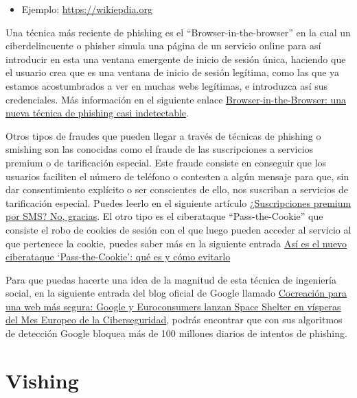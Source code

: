 \documentclass[
  a4paper,
  openany]{book}
\providecommand{\tightlist}{%
  \setlength{\itemsep}{0pt}\setlength{\parskip}{0pt}}
\begin{document}
\begin{itemize}
\tightlist
\item
  Ejemplo: \url{https://wikiepdia.org}
\end{itemize}

Una técnica más reciente de phishing es el ``Browser-in-the-browser'' en la cual un ciberdelincuente o phisher simula una página de un servicio online para así introducir en esta una ventana emergente de inicio de sesión única, haciendo que el usuario crea que es una ventana de inicio de sesión legítima, como las que ya estamos acostumbrados a ver en muchas webs legítimas, e introduzca así sus credenciales. Más información en el siguiente enlace \href{https://www.incibe.es/ciudadania/blog/browser-browser-una-nueva-tecnica-de-phishing-casi-indetectable}{Browser-in-the-Browser: una nueva técnica de phishing casi indetectable}.

Otros tipos de fraudes que pueden llegar a través de técnicas de phishing o smishing son las conocidas como el fraude de las suscripciones a servicios premium o de tarificación especial. Este fraude consiste en conseguir que los usuarios faciliten el número de teléfono o contesten a algún mensaje para que, sin dar consentimiento explícito o ser conscientes de ello, nos suscriban a servicios de tarificación especial. Puedes leerlo en el siguiente artículo \href{https://www.incibe.es/ciudadania/blog/suscripciones-premium-por-sms-no-gracias}{¿Suscripciones premium por SMS? No, gracias}. El otro tipo es el ciberataque ``Pass-the-Cookie'' que consiste el robo de cookies de sesión con el que luego pueden acceder al servicio al que pertenece la cookie, puedes saber más en la siguiente entrada \href{https://www.20minutos.es/tecnologia/ciberseguridad/ciberataque-pass-the-cookie-que-es-como-evitarlo-5163208/}{Así es el nuevo ciberataque `Pass-the-Cookie': qué es y cómo evitarlo}

Para que puedas hacerte una idea de la magnitud de esta técnica de ingeniería social, en la siguiente entrada del blog oficial de Google llamado \href{https://espana.googleblog.com/2021/09/cocreacion-para-una-web-mas-segura.html}{Cocreación para una web más segura: Google y Euroconsumers lanzan Space Shelter en vísperas del Mes Europeo de la Ciberseguridad}, podrás encontrar que con sus algoritmos de detección Google bloquea más de 100 millones diarios de intentos de phishing.

\hypertarget{vishing}{%
\section{Vishing}\label{vishing}}
\end{document}
